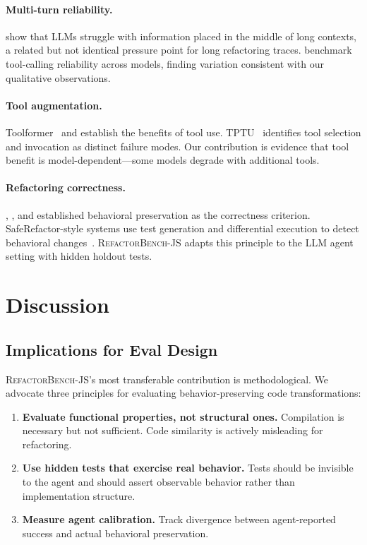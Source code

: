 \documentclass[11pt,letterpaper]{article}
\begin{document}
\paragraph{Multi-turn reliability.} \citet{liu2024lost} show that LLMs struggle with information placed in the middle of long contexts, a related but not identical pressure point for long refactoring traces. \citet{chen2024benchmarking} benchmark tool-calling reliability across models, finding variation consistent with our qualitative observations.

\paragraph{Tool augmentation.} Toolformer~\citep{schick2023toolformer} and \citet{qin2023tool} establish the benefits of tool use. TPTU~\citep{ruan2024tptu} identifies tool selection and invocation as distinct failure modes. Our contribution is evidence that tool benefit is model-dependent---some models degrade with additional tools.

\paragraph{Refactoring correctness.} \citet{opdyke1992refactoring}, \citet{griswold1993automated}, and \citet{fowler1999refactoring} established behavioral preservation as the correctness criterion. SafeRefactor-style systems use test generation and differential execution to detect behavioral changes~\citep{soares2013automated}. \textsc{RefactorBench}-JS adapts this principle to the LLM agent setting with hidden holdout tests.

\section{Discussion}

\subsection{Implications for Eval Design}

\textsc{RefactorBench}-JS's most transferable contribution is methodological. We advocate three principles for evaluating behavior-preserving code transformations:

\begin{enumerate}[leftmargin=2em]
\item \textbf{Evaluate functional properties, not structural ones.} Compilation is necessary but not sufficient. Code similarity is actively misleading for refactoring.
\item \textbf{Use hidden tests that exercise real behavior.} Tests should be invisible to the agent and should assert observable behavior rather than implementation structure.
\item \textbf{Measure agent calibration.} Track divergence between agent-reported success and actual behavioral preservation.
\end{enumerate}
\end{document}
